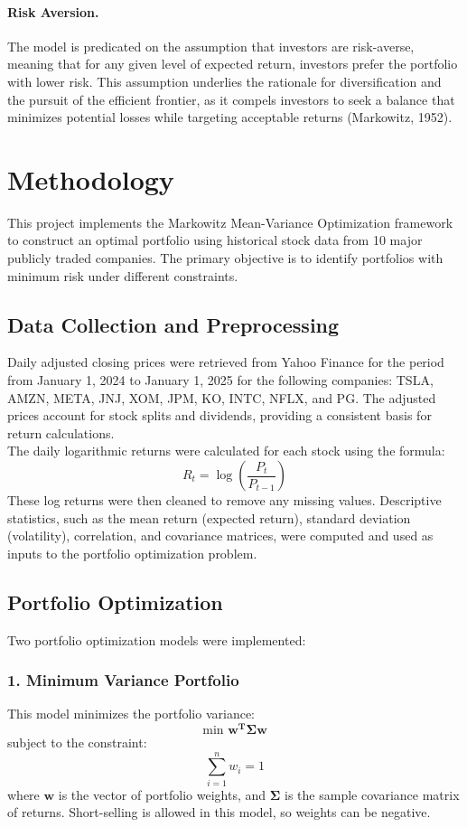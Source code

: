 \documentclass[11pt]{article}
\begin{document}
\paragraph{Risk Aversion.} The model is predicated on the assumption that investors are risk-averse, meaning that for any given level of expected return, investors prefer the portfolio with lower risk. This assumption underlies the rationale for diversification and the pursuit of the efficient frontier, as it compels investors to seek a balance that minimizes potential losses while targeting acceptable returns (Markowitz, 1952).

\section{Methodology}
This project implements the Markowitz Mean-Variance Optimization framework to construct an optimal portfolio using historical stock data from 10 major publicly traded companies. The primary objective is to identify portfolios with minimum risk under different constraints.

\subsection*{Data Collection and Preprocessing}
Daily adjusted closing prices were retrieved from Yahoo Finance for the period from January 1, 2024 to January 1, 2025 for the following companies: TSLA, AMZN, META, JNJ, XOM, JPM, KO, INTC, NFLX, and PG. The adjusted prices account for stock splits and dividends, providing a consistent basis for return calculations. \\
The daily logarithmic returns were calculated for each stock using the formula:
\[R_t=\log \left (\frac{P_t}{P_{t-1}} \right )\]
These log returns were then cleaned to remove any missing values. Descriptive statistics, such as the mean return (expected return), standard deviation (volatility), correlation, and covariance matrices, were computed and used as inputs to the portfolio optimization problem.

\subsection*{Portfolio Optimization}
Two portfolio optimization models were implemented:

\subsubsection*{1. Minimum Variance Portfolio}
This model minimizes the portfolio variance:
\[\text{min } \mathbf{w^T\Sigma w}\]
subject to the constraint:
\[\sum_{i=1}^n w_i=1\]
where $\mathbf{w}$ is the vector of portfolio weights, and $\mathbf{\Sigma}$ is the sample covariance matrix of returns. Short-selling is allowed in this model, so weights can be negative.
\end{document}
